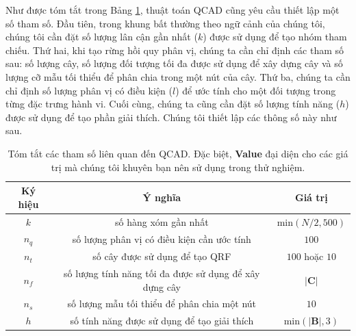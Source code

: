 Như được tóm tắt trong Bảng \ref{tab:parameters}, thuật toán QCAD cũng yêu cầu thiết lập một số tham số. Đầu tiên, trong khung bất thường theo ngữ cảnh của chúng tôi, chúng tôi cần đặt số lượng lân cận gần nhất ($k$) được sử dụng để tạo nhóm tham chiếu. Thứ hai, khi tạo rừng hồi quy phân vị, chúng ta cần chỉ định các tham số sau: số lượng cây, số lượng đối tượng tối đa được sử dụng để xây dựng cây và số lượng cỡ mẫu tối thiểu để phân chia trong một nút của cây. Thứ ba, chúng ta cần chỉ định số lượng phân vị có điều kiện ($l$) để ước tính cho một đối tượng trong từng đặc trưng hành vi. Cuối cùng, chúng ta cũng cần đặt số lượng tính năng ($h$) được sử dụng để tạo phần giải thích. Chúng tôi thiết lập các thông số này như sau.\begin{table}
  \caption{Tóm tắt các tham số liên quan đến QCAD. Đặc biệt, \textbf{Value} đại diện cho các giá trị mà chúng tôi khuyên bạn nên sử dụng trong thử nghiệm.}
  \label{tab:parameters}
  \centering
  \begin{tabular}{ccc}
    \toprule
    \textbf{Ký hiệu} & \textbf{Ý nghĩa} & \textbf{Giá trị}\\
    \midrule
    $k$ & số hàng xóm gần nhất & $\mathrm{min}(N/2,500)$\\
    $n_q$ & số lượng phân vị có điều kiện cần ước tính & $100$\\
    $n_t$ & số cây được sử dụng để tạo QRF & $100$ hoặc $10$\\
    $n_f$ & số lượng tính năng tối đa được sử dụng để xây dựng cây & $\vert\mathbf{C}\vert$\\
    $n_s$ & số lượng mẫu tối thiểu để phân chia một nút & $10$\\
    $h$ & số tính năng được sử dụng để tạo giải thích & $\mathrm{min}(\vert \mathbf{B} \vert,3)$\\
  \bottomrule
\end{tabular}
\end{table}

